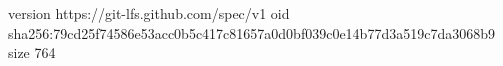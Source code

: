 version https://git-lfs.github.com/spec/v1
oid sha256:79cd25f74586e53acc0b5c417c81657a0d0bf039c0e14b77d3a519c7da3068b9
size 764
